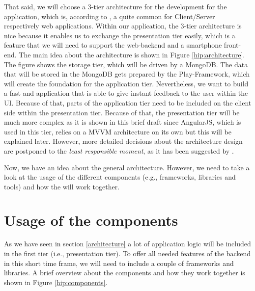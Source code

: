 That said, we will choose a 3-tier architecture for the development for the application, which is, according to \cite{Eckerson1995}, a quite common for Client/Server respectively web applications. Within our application, the 3-tier architecture is nice because it enables us to exchange the presentation tier easily, which is a feature that we will need to support the web-backend and a smartphone front-end. The main idea about the architecture is shown in Figure \ref{hip:architecture}. The figure shows the storage tier, which will be driven by a MongoDB. The data that will be stored in the MongoDB gets prepared by the Play-Framework, which will create the foundation for the application tier. Nevertheless, we want to build a fast and application that is able to give instant feedback to the user within the \ac{UI}. Because of that, parts of the application tier need to be included on the client side within the presentation tier. Because of that, the presentation tier will be much more complex as it is shown in this brief draft since AngularJS, which is used in this tier, relies on a \ac{MVVM} architecture on its own but this will be explained later.
However, more detailed decisions about the architecture design are postponed to the \textit{least responsible moment}, as it has been suggested by \cite{Mast2013}.

Now, we have an idea about the general architecture. However, we need to take a look at the usage of the different components (e.g., frameworks, libraries and tools) and how the will work together.

\section{Usage of the components}
As we have seen in section \ref{architecture} a lot of application logic will be included in the first tier (i.e., presentation tier). To offer all needed features of the backend in this short time frame, we will need to include a couple of frameworks and libraries. A brief overview about the components and how they work together is shown in Figure \ref{hip:components}. 

